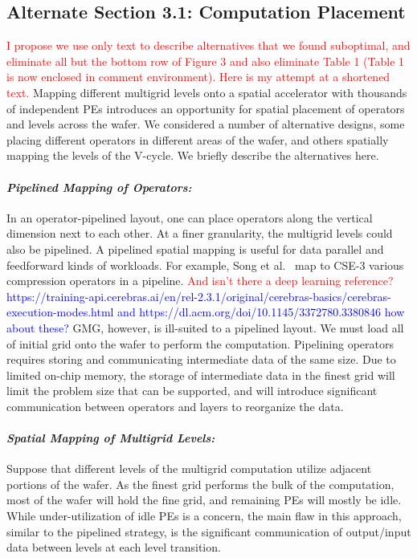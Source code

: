 \documentclass[sigconf]{acmart}
\begin{document}
\subsection{Alternate Section 3.1: Computation Placement}
\textcolor{red}{I propose we use only text to describe alternatives that we found suboptimal, and eliminate all but the bottom row of Figure 3 and also eliminate Table 1 (Table 1 is now enclosed in comment environment).  Here is my attempt at a shortened text.}
Mapping different multigrid levels onto a spatial accelerator with thousands of independent PEs introduces an opportunity for spatial placement of operators and levels across the wafer.  We considered a number of alternative designs, some placing different operators in different areas of the wafer, and others spatially mapping the levels of the V-cycle.  
We briefly describe the alternatives here. 


    


\paragraph{\textit{Pipelined Mapping of Operators:}}
In an operator-pipelined layout, one can place operators 
along the vertical dimension next to each other. At a finer granularity, the multigrid levels could also be pipelined. 
A pipelined spatial mapping is useful for data parallel and feedforward kinds of workloads.  For example, Song et al.~\cite{song_ceresz} map to CSE-3 various compression operators in a pipeline. \textcolor{red}{And isn't there a deep learning reference?} \textcolor{blue}{https://training-api.cerebras.ai/en/rel-2.3.1/original/cerebras-basics/cerebras-execution-modes.html and https://dl.acm.org/doi/10.1145/3372780.3380846 how about these? } GMG, however, is ill-suited to a pipelined layout.  We must load all of initial grid onto the wafer to perform the computation.  Pipelining operators requires storing and communicating intermediate data of the same size. Due to limited on-chip memory, the storage of intermediate data in the finest grid will limit the problem size that can be supported, and will introduce significant 
communication between operators and layers to reorganize the data.


\paragraph{\textit{Spatial Mapping of Multigrid Levels:}} Suppose that different levels of the multigrid computation utilize adjacent portions of the wafer.  As the finest grid performs the bulk of the computation, most of the wafer will hold the fine grid, and remaining PEs will mostly be idle.  While under-utilization of idle PEs is a concern, the main flaw in this approach, similar to the pipelined strategy, is the significant communication of output/input data between levels
at each level transition.
\end{document}
